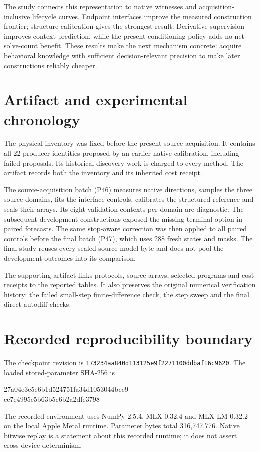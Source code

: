 \documentclass[11pt]{article}
\begin{document}
The study connects this representation to native witnesses and acquisition-
inclusive lifecycle curves. Endpoint interfaces improve the measured
construction frontier; structure calibration gives the strongest result.
Derivative supervision improves context prediction, while the present
conditioning policy adds no net solve-count benefit. These results make the
next mechanism concrete: acquire behavioral knowledge with sufficient
decision-relevant precision to make later constructions reliably cheaper.




\appendix
\section{Artifact and experimental chronology}
The physical inventory was fixed before the present source acquisition. It
contains all 22 producer identities proposed by an earlier native calibration,
including failed proposals. Its historical discovery work is charged to every
method. The artifact records both the inventory and its inherited cost receipt.

The source-acquisition batch (P46) measures native directions, samples the three
source domains, fits the interface controls, calibrates the structured reference
and seals their arrays. Its eight validation contexts per domain are diagnostic.
The subsequent development constructions exposed the missing terminal option
in paired forecasts. The same stop-aware correction was then applied to all
paired controls before the final batch (P47), which uses 288 fresh states and
masks. The final study reuses every sealed source-model byte and does not pool
the development outcomes into its comparison.

The supporting artifact links protocols, source arrays, selected programs and
cost receipts to the reported tables. It also preserves the original numerical
verification history: the failed small-step finite-difference check, the step
sweep and the final direct-autodiff checks.

\section{Recorded reproducibility boundary}
The checkpoint revision is
\texttt{173234aa840d113125e9f2271100ddbaf16c9620}.
The loaded stored-parameter SHA-256 is
\begin{center}\small\ttfamily
27a04e3e5e6b1d524751fa34d1053044bce9\\
ce7e4995e5b63b5c6b2a2dfe3798
\end{center}
The recorded environment uses NumPy 2.5.4, MLX 0.32.4 and MLX-LM 0.32.2
on the local Apple Metal runtime. Parameter bytes total 316,747,776.
Native bitwise replay is a statement about this recorded runtime; it does not
assert cross-device determinism.
\end{document}
